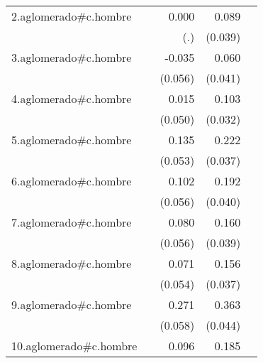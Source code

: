 {\begin{longtable}{l*{4}{D{.}{.}{-1}}}
\addlinespace
2.aglomerado#c.hombre&                     &       0.000         &       0.089\sym{*}  &                     \\
            &                     &         (.)         &     (0.039)         &                     \\
\addlinespace
3.aglomerado#c.hombre&                     &      -0.035         &       0.060         &                     \\
            &                     &     (0.056)         &     (0.041)         &                     \\
\addlinespace
4.aglomerado#c.hombre&                     &       0.015         &       0.103\sym{**} &                     \\
            &                     &     (0.050)         &     (0.032)         &                     \\
\addlinespace
5.aglomerado#c.hombre&                     &       0.135\sym{*}  &       0.222\sym{***}&                     \\
            &                     &     (0.053)         &     (0.037)         &                     \\
\addlinespace
6.aglomerado#c.hombre&                     &       0.102         &       0.192\sym{***}&                     \\
            &                     &     (0.056)         &     (0.040)         &                     \\
\addlinespace
7.aglomerado#c.hombre&                     &       0.080         &       0.160\sym{***}&                     \\
            &                     &     (0.056)         &     (0.039)         &                     \\
\addlinespace
8.aglomerado#c.hombre&                     &       0.071         &       0.156\sym{***}&                     \\
            &                     &     (0.054)         &     (0.037)         &                     \\
\addlinespace
9.aglomerado#c.hombre&                     &       0.271\sym{***}&       0.363\sym{***}&                     \\
            &                     &     (0.058)         &     (0.044)         &                     \\
\addlinespace
10.aglomerado#c.hombre&                     &       0.096         &       0.185\sym{***}&                     \\

\end{longtable}}
